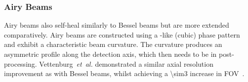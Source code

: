 \subsubsection{Airy Beams}

\gls{Airy beam}s also self-heal similarly to \gls{Bessel beam}s but are more extended comparatively.
\gls{Airy beam}s are constructed using a -like (cubic) phase pattern and exhibit a characteristic beam curvature.
The curvature produces an asymmetric profile along the detection axis, which then needs to be  in post-processing.
Vettenburg~\emph{et~al.} demonstrated a similar axial resolution improvement as with \gls{Bessel beam}s, whilst achieving a \SI{\sim3}{} increase in \gls{FOV}~\cite{vettenburg_light-sheet_2014}.


